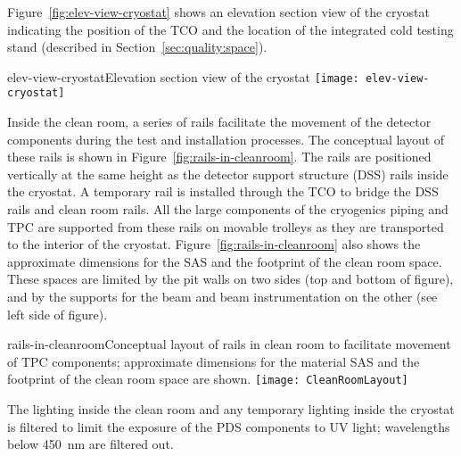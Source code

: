 Figure~\ref{fig:elev-view-cryostat} shows an elevation section view of the cryostat indicating the position of the TCO and the location of the integrated cold testing stand (described in Section~\ref{sec:quality:space}).  

\begin{cdrfigure}{elev-view-cryostat}{Elevation section view of the cryostat}
\texttt{[image: elev-view-cryostat]}
\end{cdrfigure}

Inside the clean room, a series of rails facilitate the movement of the detector components during the test and installation processes.  The conceptual layout of these rails is shown in Figure~\ref{fig:rails-in-cleanroom}.  The rails are positioned vertically at the same height as the detector support structure (DSS) rails inside the cryostat.  A temporary rail is installed through the TCO to bridge the DSS rails and clean room rails.  All the large components of the cryogenics piping and TPC are supported from these rails on movable trolleys as they are transported to the interior of the cryostat.  
Figure~\ref{fig:rails-in-cleanroom} also shows the approximate dimensions for the SAS and the footprint of the clean room space.  These spaces are limited by the pit walls on two sides (top and bottom of figure), and by the supports for the beam and beam instrumentation on the other (see left side of figure).  


\begin{cdrfigure}{rails-in-cleanroom}{Conceptual layout of rails in clean room to facilitate movement of TPC components; approximate dimensions for the material SAS and the footprint of the clean room space are shown.}
\texttt{[image: CleanRoomLayout]}
\end{cdrfigure}

The lighting inside the clean room and any temporary lighting inside the cryostat is filtered to limit the exposure of the PDS components to UV light; wavelengths below 450~nm are filtered out. 



